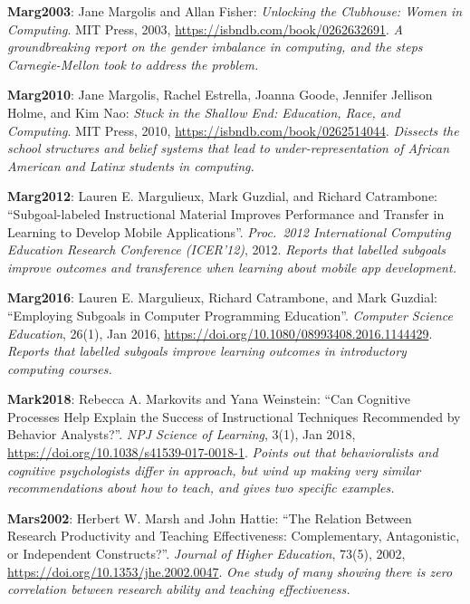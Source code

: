 \textbf{\hypertarget{b:Marg2003}{Marg2003}\label{b:Marg2003}}: Jane Margolis and Allan Fisher: \emph{Unlocking the Clubhouse: Women in Computing}. MIT Press, 2003, \url{https://isbndb.com/book/0262632691}. \emph{A groundbreaking report on the gender imbalance in computing, and the steps Carnegie-Mellon took to address the problem.}

\textbf{\hypertarget{b:Marg2010}{Marg2010}\label{b:Marg2010}}: Jane Margolis, Rachel Estrella, Joanna Goode, Jennifer Jellison Holme, and Kim Nao: \emph{Stuck in the Shallow End: Education, Race, and Computing}. MIT Press, 2010, \url{https://isbndb.com/book/0262514044}. \emph{Dissects the school structures and belief systems that lead to under-representation of African American and Latinx students in computing.}

\textbf{\hypertarget{b:Marg2012}{Marg2012}\label{b:Marg2012}}: Lauren E. Margulieux, Mark Guzdial, and Richard Catrambone: ``Subgoal-labeled Instructional Material Improves Performance and Transfer in Learning to Develop Mobile Applications''. \emph{Proc.\ 2012 International Computing Education Research Conference (ICER'12)}, 2012. \emph{Reports that labelled subgoals improve outcomes and transference when learning about mobile app development.}

\textbf{\hypertarget{b:Marg2016}{Marg2016}\label{b:Marg2016}}: Lauren E. Margulieux, Richard Catrambone, and Mark Guzdial: ``Employing Subgoals in Computer Programming Education''. \emph{Computer Science Education}, 26(1), Jan 2016, \url{https://doi.org/10.1080/08993408.2016.1144429}. \emph{Reports that labelled subgoals improve learning outcomes in introductory computing courses.}

\textbf{\hypertarget{b:Mark2018}{Mark2018}\label{b:Mark2018}}: Rebecca A. Markovits and Yana Weinstein: ``Can Cognitive Processes Help Explain the Success of Instructional Techniques Recommended by Behavior Analysts?''. \emph{NPJ Science of Learning}, 3(1), Jan 2018, \url{https://doi.org/10.1038/s41539-017-0018-1}. \emph{Points out that behavioralists and cognitive psychologists differ in approach, but wind up making very similar recommendations about how to teach, and gives two specific examples.}

\textbf{\hypertarget{b:Mars2002}{Mars2002}\label{b:Mars2002}}: Herbert W. Marsh and John Hattie: ``The Relation Between Research Productivity and Teaching Effectiveness: Complementary, Antagonistic, or Independent Constructs?''. \emph{Journal of Higher Education}, 73(5), 2002, \url{https://doi.org/10.1353/jhe.2002.0047}. \emph{One study of many showing there is zero correlation between research ability and teaching effectiveness.}


